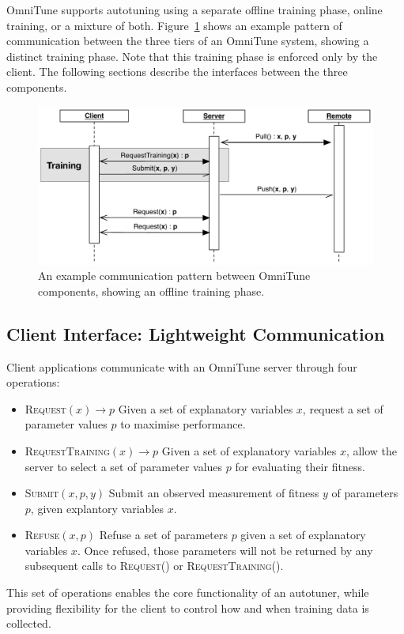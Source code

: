 OmniTune supports autotuning using a separate offline training phase,
online training, or a mixture of both. Figure~\ref{fig:omnitune-comms}
shows an example pattern of communication between the three tiers of
an OmniTune system, showing a distinct training phase. Note that this
training phase is enforced only by the client. The following sections
describe the interfaces between the three components.


\begin{figure}
\centering
\includegraphics[width=.7\textwidth]{img/omnitune-comms}
\caption[Communication pattern between OmniTune components]{%
  An example communication pattern between OmniTune components,
  showing an offline training phase.%
}
\label{fig:omnitune-comms}
\end{figure}


\subsection{Client Interface: Lightweight Communication}

Client applications communicate with an OmniTune server through four
operations:
%
\begin{itemize}
\item \textsc{Request}$(x) \to p$ Given a set of explanatory variables
  $x$, request a set of parameter values $p$ to maximise performance.
\item \textsc{RequestTraining}$(x) \to p$ Given a set of explanatory
  variables $x$, allow the server to select a set of parameter values
  $p$ for evaluating their fitness.
\item \textsc{Submit}$(x, p, y)$ Submit an observed measurement of
  fitness $y$ of parameters $p$, given explantory variables $x$.
\item \textsc{Refuse}$(x, p)$ Refuse a set of parameters $p$ given a
  set of explanatory variables $x$. Once refused, those parameters
  will not be returned by any subsequent calls to \textsc{Request()}
  or \textsc{RequestTraining()}.
\end{itemize}
%
This set of operations enables the core functionality of an autotuner,
while providing flexibility for the client to control how and when
training data is collected.


